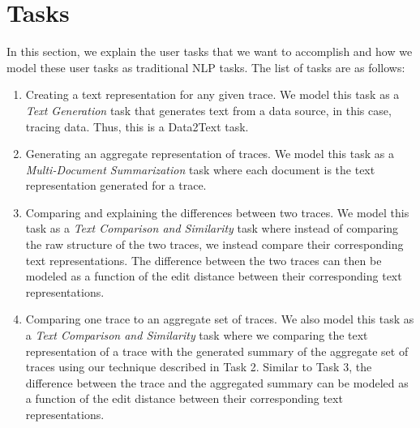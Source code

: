 \section{Tasks}
\label{sec:tasks}

In this section, we explain the user tasks that we want to accomplish and how we model
these user tasks as traditional NLP tasks. The list of tasks are as follows:

\begin{enumerate}
    \item Creating a text representation for any given trace. We model this task as a \emph{Text Generation} task
        that generates text from a data source, in this case, tracing data. Thus, this is a Data2Text task.
    \item Generating an aggregate representation of traces. We model this task as a \emph{Multi-Document Summarization} task
        where each document is the text representation generated for a trace.
    \item Comparing and explaining the differences between two traces. We model this task as a \emph{Text Comparison and Similarity} task
        where instead of comparing the raw structure of the two traces, we instead compare their corresponding text representations. The
        difference between the two traces can then be modeled as a function of the edit distance between their corresponding text representations.
    \item Comparing one trace to an aggregate set of traces. We also model this task as a \emph{Text Comparison and Similarity} task
        where we comparing the text representation of a trace with the generated summary of the aggregate set of traces using our technique described
        in Task 2. Similar to Task 3, the difference between the trace and the aggregated summary can be modeled as a function of the edit distance
        between their corresponding text representations.
\end{enumerate}